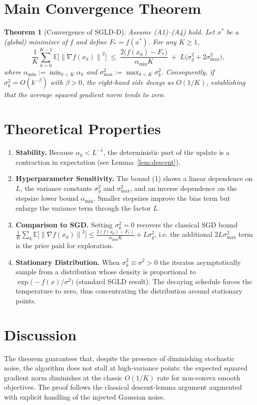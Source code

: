 \documentclass{article}
\newtheorem{theorem}{Theorem}
\newcommand{\E}{\mathbb{E}}
\newcommand{\norm}[1]{\left\|#1\right\|}
\newcommand{\grad}{\nabla}
\begin{document}
\section*{Main Convergence Theorem}
\begin{theorem}[Convergence of SGLD‑D]\label{thm:main}
Assume (A1)–(A4) hold. Let $x^{*}$ be a (global) minimizer of $f$ and define $F_{*}=f(x^{*})$. For any $K\ge1$,
\[
\frac{1}{K}\sum_{k=0}^{K-1}\E\!\big[\norm{\grad f(x_k)}^{2}\big]
\;\le\;
\frac{2\big(f(x_0)-F_{*}\big)}{\alpha_{\min}K}
\;+\;
L\big(\sigma_{g}^{2}+2\sigma_{\max}^{2}\big),
\tag{1}
\]
where $\alpha_{\min}:=\min_{k< K}\alpha_k$ and $\sigma_{\max}^{2}:=\max_{k< K}\sigma_k^{2}$.  
Consequently, if $\sigma_k^{2}=O(k^{-\beta})$ with $\beta>0$, the right‑hand side decays as $O(1/K)$, establishing that the average squared gradient norm tends to zero.
\end{theorem}

\section*{Theoretical Properties}
\begin{enumerate}[noitemsep,topsep=0pt]
\item \textbf{Stability.} Because $\alpha_k<L^{-1}$, the deterministic part of the update is a contraction in expectation (see Lemma~\ref{lem:descent}).
\item \textbf{Hyperparameter Sensitivity.} The bound (1) shows a linear dependence on $L$, the variance constants $\sigma_{g}^{2}$ and $\sigma_{\max}^{2}$, and an inverse dependence on the stepsize lower bound $\alpha_{\min}$. Smaller stepsizes improve the bias term but enlarge the variance term through the factor $L$.
\item \textbf{Comparison to SGD.} Setting $\sigma_k^{2}=0$ recovers the classical SGD bound 
$\frac{1}{K}\sum_{k}\E\!\big[\norm{\grad f(x_k)}^{2}\big]\le
\frac{2(f(x_0)-F_{*})}{\alpha_{\min}K}+L\sigma_{g}^{2}$, i.e. the additional $2L\sigma_{\max}^{2}$ term is the price paid for exploration.
\item \textbf{Stationary Distribution.} When $\sigma_k^{2}\equiv\sigma^{2}>0$ the iterates asymptotically sample from a distribution whose density is proportional to $\exp\!\big(-f(x)/\sigma^{2}\big)$ (standard SGLD result). The decaying schedule forces the temperature to zero, thus concentrating the distribution around stationary points.
\end{enumerate}

\section*{Discussion}
The theorem guarantees that, despite the presence of diminishing stochastic noise, the algorithm does not stall at high‑variance points: the expected squared gradient norm diminishes at the classic $O(1/K)$ rate for non‑convex smooth objectives. The proof follows the classical descent‑lemma argument augmented with explicit handling of the injected Gaussian noise.
\end{document}
